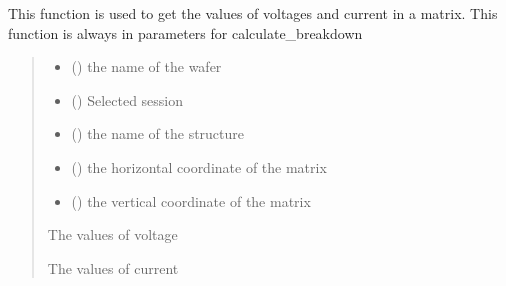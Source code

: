 \documentclass[letterpaper,10pt,english]{sphinxmanual}
\begin{document}
\begin{fulllineitems}
\label{\detokenize{VBD:VBD.get_vectors_in_matrix}}
\pysigstartsignatures
{}
\pysigstopsignatures
\sphinxAtStartPar
This function is used to get the values of voltages and current in a matrix. This function is always in parameters for calculate\_breakdown
\begin{quote}\begin{description}
\begin{itemize}
\item {} 
\sphinxAtStartPar
{} () \textendash{} the name of the wafer

\item {} 
\sphinxAtStartPar
{} () \textendash{} Selected session

\item {} 
\sphinxAtStartPar
{} () \textendash{} the name of the structure

\item {} 
\sphinxAtStartPar
{} () \textendash{} the horizontal coordinate of the matrix

\item {} 
\sphinxAtStartPar
{} () \textendash{} the vertical coordinate of the matrix

\end{itemize}

\sphinxAtStartPar
The values of voltage

\sphinxAtStartPar
The values of current

\end{description}\end{quote}

\end{fulllineitems}
\end{document}
